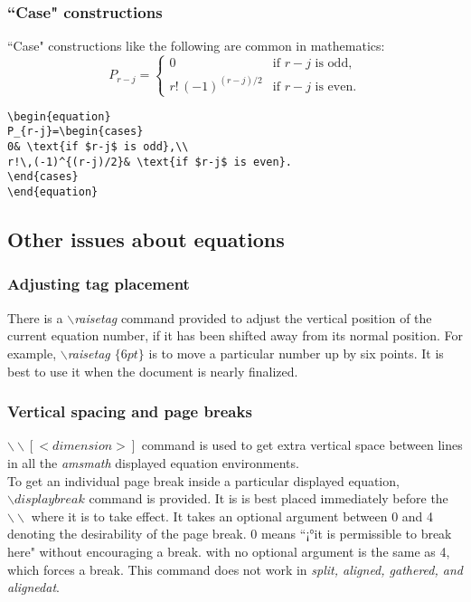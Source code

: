 \documentclass[12pt]{beamer}
\begin{document}
\begin{frame}[fragile]
  \frametitle{``Case" constructions}
  ``Case" constructions like the following are common in mathematics:\\
  \begin{equation*}
    P_{r-j}=\begin{cases}
        0& \text{if $r-j$ is odd},\\
        r!\,(-1)^{(r-j)/2}& \text{if $r-j$ is even}.
    \end{cases}
  \end{equation*}
  \begin{verbatim}
\begin{equation}
P_{r-j}=\begin{cases}
0& \text{if $r-j$ is odd},\\
r!\,(-1)^{(r-j)/2}& \text{if $r-j$ is even}.
\end{cases}
\end{equation}
  \end{verbatim}
\end{frame}
\subsection{Other issues about equations }
\begin{frame}
  \frametitle{Adjusting tag placement}
  There is a $\backslash$\emph{raisetag} command provided to adjust the vertical position of the current equation number, if it has been shifted away from its normal position. For example, $\backslash$\emph{raisetag $\{6pt\}$} is to move a particular number up by six points. It is best to use it when the document is nearly finalized.
\end{frame}

\begin{frame}
  \frametitle{Vertical spacing and page breaks}
  $\backslash\backslash[<dimension>]$ command is used to get extra vertical space between lines in all the \emph{amsmath} displayed equation environments. \\
  To get an individual page break inside a particular displayed equation, $\backslash displaybreak$ command is provided. It is is best placed immediately before the $\backslash\backslash$ where it is to take effect. It takes an optional argument between 0 and 4 denoting the desirability of the page break. 0 means ``¡°it is permissible to break here" without encouraging a break. with no optional argument is the same as 4, which forces a break. This command does not work in \emph{split, aligned, gathered, and alignedat}.
\end{frame}
\end{document}
